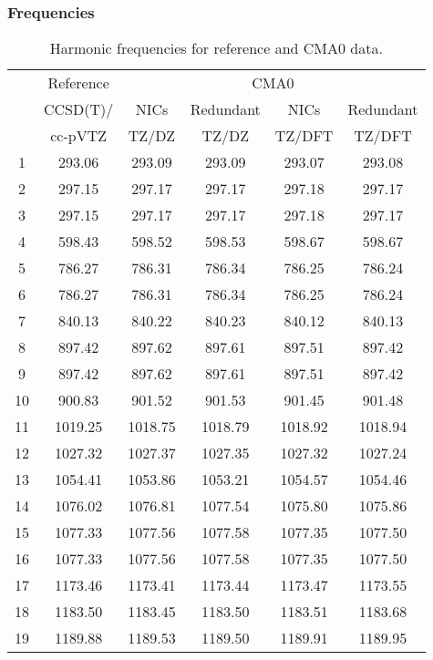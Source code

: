 \documentclass[10pt,oneside]{article}
\begin{document}
\begin{table}[h!]
\subsubsection*{Frequencies}
\centering
\caption{Harmonic frequencies for reference and CMA0 data.}
\begin{tabular}{cccccc}
\toprule
{} & Reference & \multicolumn{4}{c}{CMA0} \\
{} &  CCSD(T)/ &    NICs &  Redundant &    NICs & Redundant \\
{} &   cc-pVTZ &   TZ/DZ &      TZ/DZ &  TZ/DFT &    TZ/DFT \\
\midrule
1  &    293.06 &  293.09 &     293.09 &  293.07 &    293.08 \\
2  &    297.15 &  297.17 &     297.17 &  297.18 &    297.17 \\
3  &    297.15 &  297.17 &     297.17 &  297.18 &    297.17 \\
4  &    598.43 &  598.52 &     598.53 &  598.67 &    598.67 \\
5  &    786.27 &  786.31 &     786.34 &  786.25 &    786.24 \\
6  &    786.27 &  786.31 &     786.34 &  786.25 &    786.24 \\
7  &    840.13 &  840.22 &     840.23 &  840.12 &    840.13 \\
8  &    897.42 &  897.62 &     897.61 &  897.51 &    897.42 \\
9  &    897.42 &  897.62 &     897.61 &  897.51 &    897.42 \\
10 &    900.83 &  901.52 &     901.53 &  901.45 &    901.48 \\
11 &   1019.25 & 1018.75 &    1018.79 & 1018.92 &   1018.94 \\
12 &   1027.32 & 1027.37 &    1027.35 & 1027.32 &   1027.24 \\
13 &   1054.41 & 1053.86 &    1053.21 & 1054.57 &   1054.46 \\
14 &   1076.02 & 1076.81 &    1077.54 & 1075.80 &   1075.86 \\
15 &   1077.33 & 1077.56 &    1077.58 & 1077.35 &   1077.50 \\
16 &   1077.33 & 1077.56 &    1077.58 & 1077.35 &   1077.50 \\
17 &   1173.46 & 1173.41 &    1173.44 & 1173.47 &   1173.55 \\
18 &   1183.50 & 1183.45 &    1183.50 & 1183.51 &   1183.68 \\
19 &   1189.88 & 1189.53 &    1189.50 & 1189.91 &   1189.95 \\

\end{tabular}
\end{table}
\end{document}
